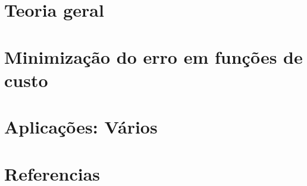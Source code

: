 \documentclass[12pt]{extbook} %
\begin{document}
\part{Teoria geral}


\part{Minimização do erro em funções de custo}




\part{Aplicações: Vários}






\part{Referencias}
\end{document}
